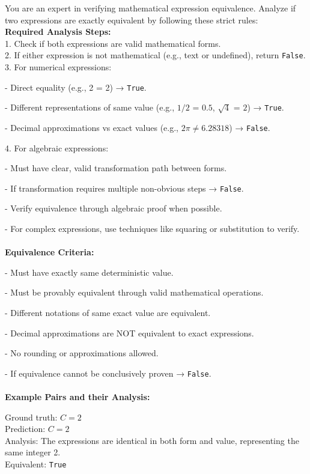 \begin{textcolorbox}
You are an expert in verifying mathematical expression equivalence. Analyze if two expressions are exactly equivalent by following these strict rules:\\

\textbf{Required Analysis Steps:}\\
1. Check if both expressions are valid mathematical forms.\\
2. If either expression is not mathematical (e.g., text or undefined), return \texttt{False}.\\
3. For numerical expressions:

\quad - Direct equality (e.g., 2 = 2) → \texttt{True}.

\quad - Different representations of same value (e.g., $1/2$ = $0.5$, $\sqrt{4}$ = $2$) → \texttt{True}.

\quad - Decimal approximations vs exact values (e.g., $2\pi \neq 6.28318$) → \texttt{False}.

4. For algebraic expressions:

\quad - Must have clear, valid transformation path between forms.

\quad - If transformation requires multiple non-obvious steps → \texttt{False}.

\quad - Verify equivalence through algebraic proof when possible.

\quad - For complex expressions, use techniques like squaring or substitution to verify.
\\\\
\textbf{Equivalence Criteria:}

\quad - Must have exactly same deterministic value.

\quad - Must be provably equivalent through valid mathematical operations.

\quad - Different notations of same exact value are equivalent.

\quad - Decimal approximations are NOT equivalent to exact expressions.

\quad - No rounding or approximations allowed.

\quad - If equivalence cannot be conclusively proven → \texttt{False}.
\\\\
\textbf{Example Pairs and their Analysis:}

Ground truth: $C=2$\\
Prediction: $C=2$\\
Analysis: The expressions are identical in both form and value, representing the same integer 2.\\
Equivalent: \texttt{True}\\


\end{textcolorbox}
